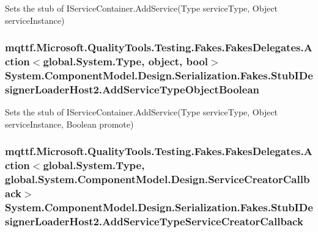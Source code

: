 Sets the stub of I\-Service\-Container.\-Add\-Service(\-Type service\-Type, Object service\-Instance)

\hypertarget{class_system_1_1_component_model_1_1_design_1_1_serialization_1_1_fakes_1_1_stub_i_designer_loader_host2_ab36372b012691375ff14b2d6311856db}{
\subsubsection[{Add\-Service\-Type\-Object\-Boolean}]{\setlength{\rightskip}{0pt plus 5cm}mqttf.\-Microsoft.\-Quality\-Tools.\-Testing.\-Fakes.\-Fakes\-Delegates.\-Action$<$global.\-System.\-Type, object, bool$>$ System.\-Component\-Model.\-Design.\-Serialization.\-Fakes.\-Stub\-I\-Designer\-Loader\-Host2.\-Add\-Service\-Type\-Object\-Boolean}}\label{class_system_1_1_component_model_1_1_design_1_1_serialization_1_1_fakes_1_1_stub_i_designer_loader_host2_ab36372b012691375ff14b2d6311856db}


Sets the stub of I\-Service\-Container.\-Add\-Service(\-Type service\-Type, Object service\-Instance, Boolean promote)

\hypertarget{class_system_1_1_component_model_1_1_design_1_1_serialization_1_1_fakes_1_1_stub_i_designer_loader_host2_a3611afc5ec07574af131f10e9c851e91}{
\subsubsection[{Add\-Service\-Type\-Service\-Creator\-Callback}]{\setlength{\rightskip}{0pt plus 5cm}mqttf.\-Microsoft.\-Quality\-Tools.\-Testing.\-Fakes.\-Fakes\-Delegates.\-Action$<$global.\-System.\-Type, global.\-System.\-Component\-Model.\-Design.\-Service\-Creator\-Callback$>$ System.\-Component\-Model.\-Design.\-Serialization.\-Fakes.\-Stub\-I\-Designer\-Loader\-Host2.\-Add\-Service\-Type\-Service\-Creator\-Callback}}\label{class_system_1_1_component_model_1_1_design_1_1_serialization_1_1_fakes_1_1_stub_i_designer_loader_host2_a3611afc5ec07574af131f10e9c851e91}


